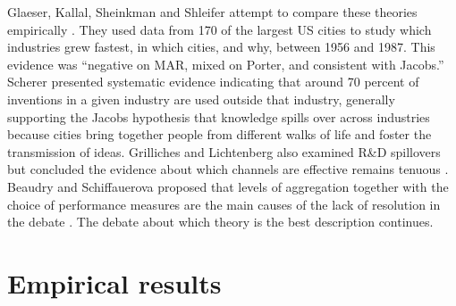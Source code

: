 \documentclass[a4paper]{article}
\theoremstyle{definition}
\theoremstyle{plain}
\begin{document}
 Glaeser, Kallal, Sheinkman and Shleifer attempt to compare these theories empirically \cite{glaeserGrowthCities1991}. They used data from 170 of the largest US cities to study which industries grew fastest, in which cities, and why, between 1956 and 1987. %
This evidence was ``negative on MAR, mixed on Porter, and consistent with Jacobs.'' Scherer \cite{schererInterindustryTechnologyFlows1982} presented systematic evidence indicating that around 70 percent of inventions in a given industry are used outside that industry, generally supporting the Jacobs hypothesis that knowledge spills over across industries because cities bring together people from different walks of life and foster the transmission of ideas. Grilliches and Lichtenberg also examined R\&D spillovers but concluded the evidence about which channels are effective remains tenuous \cite{grilichesInterindustryTechnologyFlows1984}. Beaudry and Schiffauerova proposed that levels of aggregation together with the choice of performance measures are the main causes of the lack of resolution in the debate \cite{beaudryWhoRightMarshall2009}. The debate about which theory is the best description continues. 





\section{Empirical results}
\end{document}
